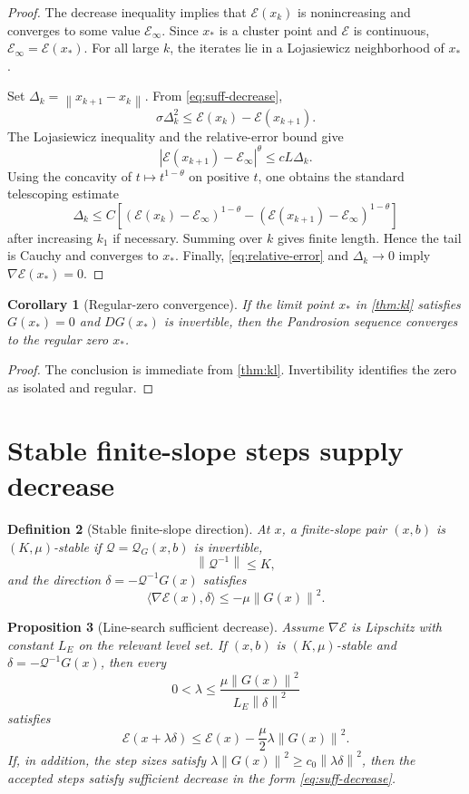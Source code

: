 \documentclass[11pt]{article}
\newtheorem{definition}{Definition}[section]
\newtheorem{proposition}[definition]{Proposition}
\newtheorem{corollary}[definition]{Corollary}
\newcommand{\E}{\mathcal E}
\newcommand{\Q}{\mathcal Q}
\newcommand{\norm}[1]{\left\lVert #1\right\rVert}
\begin{document}
\begin{proof}
The decrease inequality implies that \(\E(x_k)\) is nonincreasing and converges to some value \(\E_\infty\). Since \(x_\ast\) is a cluster point and \(\E\) is continuous, \(\E_\infty=\E(x_\ast)\). For all large \(k\), the iterates lie in a Lojasiewicz neighborhood of \(x_\ast\).

Set \(\Delta_k=\norm{x_{k+1}-x_k}\). From \eqref{eq:suff-decrease},
\[
        \sigma \Delta_k^2\le \E(x_k)-\E(x_{k+1}).
\]
The Lojasiewicz inequality and the relative-error bound give
\[
        |\E(x_{k+1})-\E_\infty|^\theta
        \le cL\Delta_k.
\]
Using the concavity of \(t\mapsto t^{1-\theta}\) on positive \(t\), one obtains the standard telescoping estimate
\[
        \Delta_k
        \le
        C\left[
        (\E(x_k)-\E_\infty)^{1-\theta}
        -
        (\E(x_{k+1})-\E_\infty)^{1-\theta}
        \right]
\]
after increasing \(k_1\) if necessary. Summing over \(k\) gives finite length. Hence the tail is Cauchy and converges to \(x_\ast\). Finally, \eqref{eq:relative-error} and \(\Delta_k\to0\) imply \(\nabla\E(x_\ast)=0\).
\end{proof}

\begin{corollary}[Regular-zero convergence]\label{cor:regular-zero}
If the limit point \(x_\ast\) in \cref{thm:kl} satisfies \(G(x_\ast)=0\) and \(DG(x_\ast)\) is invertible, then the Pandrosion sequence converges to the regular zero \(x_\ast\).
\end{corollary}

\begin{proof}
The conclusion is immediate from \cref{thm:kl}. Invertibility identifies the zero as isolated and regular.
\end{proof}

\section{Stable finite-slope steps supply decrease}

\begin{definition}[Stable finite-slope direction]
At \(x\), a finite-slope pair \((x,b)\) is \((K,\mu)\)-stable if \(\Q=\Q_G(x,b)\) is invertible,
\[
        \norm{\Q^{-1}}\le K,
\]
and the direction \(\delta=-\Q^{-1}G(x)\) satisfies
\[
        \langle \nabla\E(x),\delta\rangle\le -\mu\norm{G(x)}^2.
\]
\end{definition}

\begin{proposition}[Line-search sufficient decrease]\label{prop:line-search}
Assume \(\nabla\E\) is Lipschitz with constant \(L_E\) on the relevant level set. If \((x,b)\) is \((K,\mu)\)-stable and \(\delta=-\Q^{-1}G(x)\), then every
\[
        0<\lambda\le \frac{\mu\norm{G(x)}^2}{L_E\norm{\delta}^2}
\]
satisfies
\[
        \E(x+\lambda\delta)
        \le
        \E(x)-\frac{\mu}{2}\lambda\norm{G(x)}^2.
\]
If, in addition, the step sizes satisfy \(\lambda\norm{G(x)}^2\ge c_0\norm{\lambda\delta}^2\), then the accepted steps satisfy sufficient decrease in the form \eqref{eq:suff-decrease}.
\end{proposition}
\end{document}
